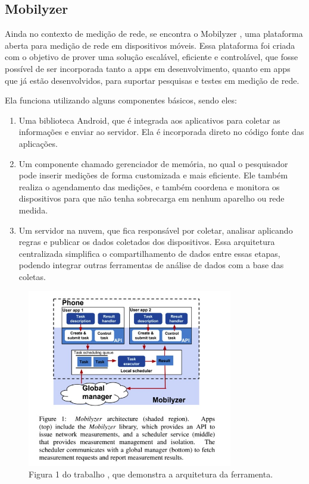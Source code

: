 \documentclass[12pt]{tcc}
\begin{document}
	\subsection{Mobilyzer}
	\par Ainda no contexto de medição de rede, se encontra o Mobilyzer \citep{Nikravesh2015Mobilyzer}, uma plataforma aberta para medição de rede em dispositivos móveis. Essa plataforma foi criada com o objetivo de prover uma solução escalável, eficiente e controlável, que fosse possível de ser incorporada tanto a apps em desenvolvimento, quanto em apps que já estão desenvolvidos, para suportar pesquisas e testes em medição de rede. 
	\par Ela funciona utilizando alguns componentes básicos, sendo eles: 
	\begin{enumerate}
		\item Uma biblioteca Android, que é integrada aos aplicativos para coletar as informações e enviar ao servidor. Ela é incorporada direto no código fonte das aplicações.
		\item Um componente chamado gerenciador de memória, no qual o pesquisador pode inserir medições de forma customizada e mais eficiente. Ele também realiza o agendamento das medições, e também coordena e monitora os dispositivos para que não tenha sobrecarga em nenhum aparelho ou rede medida. 
		\item Um servidor na nuvem, que fica responsável por coletar, analisar aplicando regras e publicar os dados coletados dos dispositivos. Essa arquitetura centralizada simplifica o compartilhamento de dados entre essas etapas, podendo integrar outras ferramentas de análise de dados com a base das coletas.

	\end{enumerate}

	\begin{figure}[!ht]
		\centering
		\includegraphics[width=0.8\textwidth]{figures/mobilyzer.jpeg}
		\caption{Figura 1 do trabalho \citep{Nikravesh2015Mobilyzer}, que demonstra a arquitetura da ferramenta. }
		\label{fig:mobilyzer}
	\end{figure}
\end{document}
